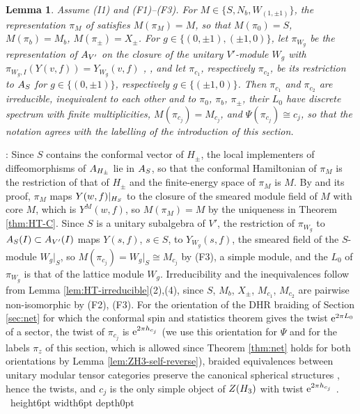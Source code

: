 \documentclass[leqno]{article}
\let\cal\relax
\newcommand{\cal}{\mathcal}
\newcommand{\qed}{\hfill \vrule height6pt  width6pt depth0pt}
\let\i\relax
\newcommand{\i}{\mathrm{i}}
\newcommand{\e}{\mathrm{e}}
\newtheorem{lemma}[thm]{Lemma}
\newenvironment{proof}[1][]{\noindent {\it Proof #1} : }{\hbox{~}\qed
\smallskip
}
\numberwithin{equation}{section}
\begin{document}
\begin{lemma}
\label{lem:lattice-sectors}
Assume \textup{(I1)} and \textup{(F1)}--\textup{(F3)}. For $M \in \{S, N_b, W_{(1,\pm1)}\}$, the representation $\pi_M$ of \cite[Lemma 4.7]{ArhII} satisfies $M(\pi_M) = M$, so that $M(\pi_0) = S$, $M(\pi_b) = M_b$, $M(\pi_\pm) = X_\pm$. For $g \in \{(0,\pm1),(\pm1,0)\}$, let $\pi_{W_g}$ be the representation of $\cal A_{V'}$ on the closure of the unitary $V'$-module $W_g$ with $\pi_{W_g,I}(Y(v,f)) = Y_{W_g}(v,f)$ \cite[Definition 4.22 p.~43 and Example 6.19(b) p.~71]{Gui25}, \cite[Corollary 4.11 p.~21]{CGGH23}, and let $\pi_{c_1}$, respectively $\pi_{c_2}$, be its restriction to $\cal A_S$ for $g \in \{(0,\pm1)\}$, respectively $g \in \{(\pm1,0)\}$. Then $\pi_{c_1}$ and $\pi_{c_2}$ are irreducible, inequivalent to each other and to $\pi_0$, $\pi_b$, $\pi_\pm$, their $L_0$ have discrete spectrum with finite multiplicities, $M(\pi_{c_j}) = M_{c_j}$, and $\Psi(\pi_{c_j}) \cong c_j$, so that the notation agrees with the labelling of the introduction of this section.
\end{lemma}

\begin{proof}
Since $S$ contains the conformal vector of $H_\pm$, the local implementers of diffeomorphisms of $\cal A_{H_\pm}$ lie in $\cal A_S$, so that the conformal Hamiltonian of $\pi_M$ is the restriction of that of $H_\pm$ and the finite-energy space of $\pi_M$ is $M$. By \cite[Lemma 4.7(1)]{ArhII} and its proof, $\pi_M$ maps $Y(w,f)|_{\cal H_S}$ to the closure of the smeared module field of $M$ with core $M$, which is $Y^M(w,f)$, so $M(\pi_M) = M$ by the uniqueness in Theorem \ref{thm:HT-C}. Since $S$ is a unitary subalgebra of $V'$, the restriction of $\pi_{W_g}$ to $\cal A_S(I) \subset \cal A_{V'}(I)$ maps $Y(s,f)$, $s \in S$, to $Y_{W_g}(s,f)$, the smeared field of the $S$-module $W_g|_S$, so $M(\pi_{c_j}) = W_g|_S \cong M_{c_j}$ by (F3), a simple module, and the $L_0$ of $\pi_{W_g}$ is that of the lattice module $W_g$. Irreducibility and the inequivalences follow from Lemma \ref{lem:HT-irreducible}(2),(4), since $S$, $M_b$, $X_\pm$, $M_{c_1}$, $M_{c_2}$ are pairwise non-isomorphic by (F2), (F3). For the orientation of the DHR braiding of Section \ref{sec:net} for which the conformal spin and statistics theorem \cite{GuL96} gives the twist $\e^{2\pi\i L_0}$ of a sector, the twist of $\pi_{c_j}$ is $\e^{2\pi\i h_{c_j}}$ (we use this orientation for $\Psi$ and for the labels $\pi_z$ of this section, which is allowed since Theorem \ref{thm:net} holds for both orientations by Lemma \ref{lem:ZH3-self-reverse}), braided equivalences between unitary modular tensor categories preserve the canonical spherical structures \cite[Proposition 8.23 p.~34]{ENO05}, hence the twists, and $c_j$ is the only simple object of $Z(\cal H_3)$ with twist $\e^{2\pi\i h_{c_j}}$ \cite[Section 2.2]{ArhII}.
\end{proof}
\end{document}
